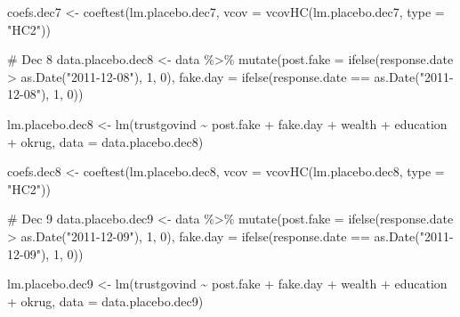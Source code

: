 \documentclass[
  letterpaper,
  DIV=11,
  numbers=noendperiod]{scrartcl}
\newenvironment{Shaded}{\begin{snugshade}}{\end{snugshade}}
\newcommand{\AttributeTok}[1]{\textcolor[rgb]{0.40,0.45,0.13}{#1}}
\newcommand{\CommentTok}[1]{\textcolor[rgb]{0.37,0.37,0.37}{#1}}
\newcommand{\DecValTok}[1]{\textcolor[rgb]{0.68,0.00,0.00}{#1}}
\newcommand{\FunctionTok}[1]{\textcolor[rgb]{0.28,0.35,0.67}{#1}}
\newcommand{\NormalTok}[1]{\textcolor[rgb]{0.00,0.23,0.31}{#1}}
\newcommand{\OtherTok}[1]{\textcolor[rgb]{0.00,0.23,0.31}{#1}}
\newcommand{\SpecialCharTok}[1]{\textcolor[rgb]{0.37,0.37,0.37}{#1}}
\newcommand{\StringTok}[1]{\textcolor[rgb]{0.13,0.47,0.30}{#1}}
\begin{document}
\begin{Shaded}
\begin{Highlighting}[]
\NormalTok{coefs.dec7 }\OtherTok{\textless{}{-}} \FunctionTok{coeftest}\NormalTok{(lm.placebo.dec7, }\AttributeTok{vcov =} \FunctionTok{vcovHC}\NormalTok{(lm.placebo.dec7, }\AttributeTok{type =} \StringTok{"HC2"}\NormalTok{))}

\CommentTok{\# Dec 8}
\NormalTok{data.placebo.dec8 }\OtherTok{\textless{}{-}}\NormalTok{ data }\SpecialCharTok{\%\textgreater{}\%} 
  \FunctionTok{mutate}\NormalTok{(}\AttributeTok{post.fake =} \FunctionTok{ifelse}\NormalTok{(response.date }\SpecialCharTok{\textgreater{}} \FunctionTok{as.Date}\NormalTok{(}\StringTok{"2011{-}12{-}08"}\NormalTok{), }\DecValTok{1}\NormalTok{, }\DecValTok{0}\NormalTok{),}
         \AttributeTok{fake.day =} \FunctionTok{ifelse}\NormalTok{(response.date }\SpecialCharTok{==} \FunctionTok{as.Date}\NormalTok{(}\StringTok{"2011{-}12{-}08"}\NormalTok{), }\DecValTok{1}\NormalTok{, }\DecValTok{0}\NormalTok{))}

\NormalTok{lm.placebo.dec8 }\OtherTok{\textless{}{-}} \FunctionTok{lm}\NormalTok{(trustgovind }\SpecialCharTok{\textasciitilde{}}\NormalTok{ post.fake }\SpecialCharTok{+}\NormalTok{ fake.day }\SpecialCharTok{+}\NormalTok{ wealth }\SpecialCharTok{+}\NormalTok{ education }\SpecialCharTok{+}\NormalTok{ okrug, }
                      \AttributeTok{data =}\NormalTok{ data.placebo.dec8)}

\NormalTok{coefs.dec8 }\OtherTok{\textless{}{-}} \FunctionTok{coeftest}\NormalTok{(lm.placebo.dec8, }\AttributeTok{vcov =} \FunctionTok{vcovHC}\NormalTok{(lm.placebo.dec8, }\AttributeTok{type =} \StringTok{"HC2"}\NormalTok{))}

\CommentTok{\# Dec 9}
\NormalTok{data.placebo.dec9 }\OtherTok{\textless{}{-}}\NormalTok{ data }\SpecialCharTok{\%\textgreater{}\%} 
  \FunctionTok{mutate}\NormalTok{(}\AttributeTok{post.fake =} \FunctionTok{ifelse}\NormalTok{(response.date }\SpecialCharTok{\textgreater{}} \FunctionTok{as.Date}\NormalTok{(}\StringTok{"2011{-}12{-}09"}\NormalTok{), }\DecValTok{1}\NormalTok{, }\DecValTok{0}\NormalTok{),}
         \AttributeTok{fake.day =} \FunctionTok{ifelse}\NormalTok{(response.date }\SpecialCharTok{==} \FunctionTok{as.Date}\NormalTok{(}\StringTok{"2011{-}12{-}09"}\NormalTok{), }\DecValTok{1}\NormalTok{, }\DecValTok{0}\NormalTok{))}

\NormalTok{lm.placebo.dec9 }\OtherTok{\textless{}{-}} \FunctionTok{lm}\NormalTok{(trustgovind }\SpecialCharTok{\textasciitilde{}}\NormalTok{ post.fake }\SpecialCharTok{+}\NormalTok{ fake.day }\SpecialCharTok{+}\NormalTok{ wealth }\SpecialCharTok{+}\NormalTok{ education }\SpecialCharTok{+}\NormalTok{ okrug, }
                      \AttributeTok{data =}\NormalTok{ data.placebo.dec9)}


\end{Highlighting}
\end{Shaded}
\end{document}
